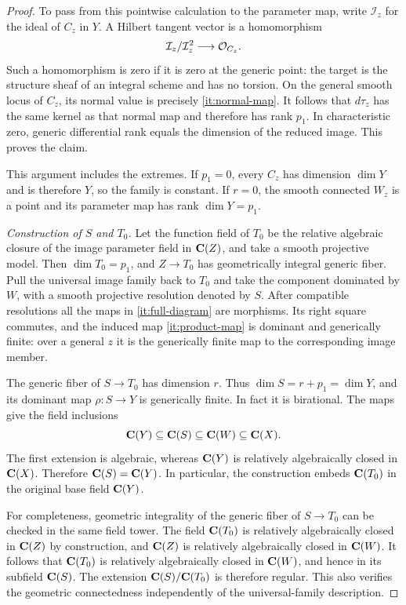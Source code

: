 \begin{proof}
To pass from this pointwise calculation to the parameter map, write
$\mathcal I_z$ for the ideal of $C_z$ in $Y$.  A Hilbert tangent vector
is a homomorphism
\[
 \mathcal I_z/\mathcal I_z^2\longrightarrow\mathcal O_{C_z}.
\]
Such a homomorphism is zero if it is zero at the generic point: the
target is the structure sheaf of an integral scheme and has no
torsion.  On the general smooth locus of $C_z$, its normal value is
precisely \eqref{it:normal-map}.  It follows that $d\tau_z$ has the
same kernel as that normal map and therefore has rank $p_1$.  In
characteristic zero, generic differential rank equals the dimension
of the reduced image.  This proves the claim.

This argument includes the extremes.  If $p_1=0$, every $C_z$ has
dimension $\dim Y$ and is therefore $Y$, so the family is constant.
If $r=0$, the smooth connected $W_z$ is a point and its parameter
map has rank $\dim Y=p_1$.

\emph{Construction of $S$ and $T_0$.}
Let the function field of $T_0$ be the relative algebraic closure of
the image parameter field in $\mathbf C(Z)$, and take a smooth projective
model.  Then $\dim T_0=p_1$, and $Z\to T_0$ has geometrically
integral generic fiber.  Pull the universal image family back to
$T_0$ and take the component dominated by $W$, with a smooth
projective resolution denoted by $S$.  After compatible resolutions
all the maps in \eqref{it:full-diagram} are morphisms.  Its right
square commutes, and the induced map \eqref{it:product-map} is
dominant and generically finite: over a general $z$ it is the
generically finite map to the corresponding image member.

The generic fiber of $S\to T_0$ has dimension $r$.  Thus
$\dim S=r+p_1=\dim Y$, and its dominant map $\rho:S\to Y$ is
generically finite.  In fact it is birational.  The maps give the
field inclusions
\begin{equation}\label{it:field-tower}
 \mathbf C(Y)\subseteq\mathbf C(S)\subseteq\mathbf C(W)\subseteq\mathbf C(X).
\end{equation}
The first extension is algebraic, whereas $\mathbf C(Y)$ is relatively
algebraically closed in $\mathbf C(X)$.  Therefore $\mathbf C(S)=\mathbf C(Y)$.
In particular, the construction embeds $\mathbf C(T_0)$ in the original
base field $\mathbf C(Y)$.

For completeness, geometric integrality of the generic fiber of
$S\to T_0$ can be checked in the same field tower.  The field
$\mathbf C(T_0)$ is relatively algebraically closed in $\mathbf C(Z)$ by
construction, and $\mathbf C(Z)$ is relatively algebraically closed in
$\mathbf C(W)$.  It follows that $\mathbf C(T_0)$ is relatively algebraically
closed in $\mathbf C(W)$, and hence in its subfield $\mathbf C(S)$.  The
extension $\mathbf C(S)/\mathbf C(T_0)$ is therefore regular.  This also verifies
the geometric connectedness independently of the universal-family
description.


\end{proof}
